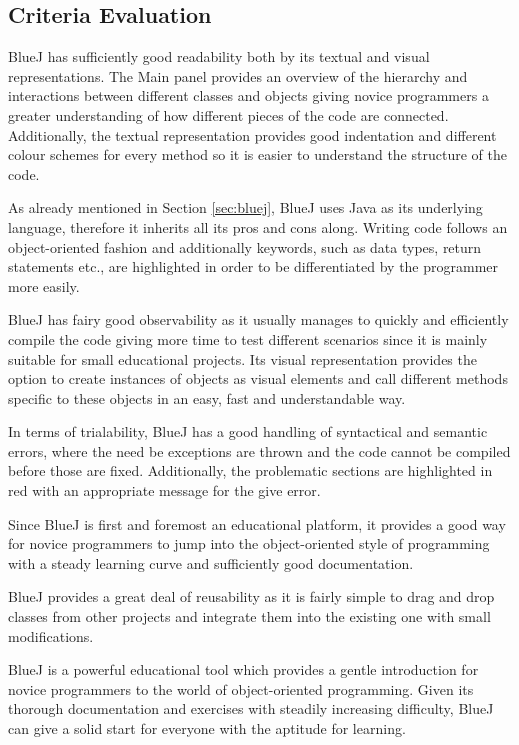 \subsection{Criteria Evaluation}
\begin{description}[style=nextline]
\item[Readability]
BlueJ has sufficiently good readability both by its textual and visual representations. The Main panel provides an overview of the hierarchy and interactions between different classes and objects giving novice programmers a greater understanding of how different pieces of the code are connected. Additionally, the textual representation provides good indentation and different colour schemes for every method so it is easier to understand the structure of the code.
\item[Writability]
As already mentioned in Section \ref{sec:bluej}, BlueJ uses Java as its underlying language, therefore it inherits all its pros and cons along. Writing code follows an object-oriented fashion and additionally keywords, such as data types, return statements etc., are highlighted in order to be differentiated by the programmer more easily.
\item[Observability]
BlueJ has fairy good observability as it usually manages to quickly and efficiently compile the code giving more time to test different scenarios since it is mainly suitable for small educational projects. Its visual representation provides the option to create instances of objects as visual elements and call different methods specific to these objects in an easy, fast and understandable way.  
\item[Trialability]
In terms of trialability, BlueJ has a good handling of syntactical and semantic errors, where the need be exceptions are thrown and the code cannot be compiled before those are fixed. Additionally, the problematic sections are highlighted in red with an appropriate message for the give error.
\item[Learnability]
Since BlueJ is first and foremost an educational platform, it provides a good way for novice programmers to jump into the object-oriented style of programming with a steady learning curve and sufficiently good documentation.
\item[Reusability]
BlueJ provides a great deal of reusability as it is fairly simple to drag and drop classes from other projects and integrate them into the existing one with small modifications. 
\item[Pedagogic Value]
BlueJ is a powerful educational tool which provides a gentle introduction for novice programmers to the world of object-oriented programming. Given its thorough documentation and exercises with steadily increasing difficulty, BlueJ can give a solid start for everyone with the aptitude for learning.

\end{description}
